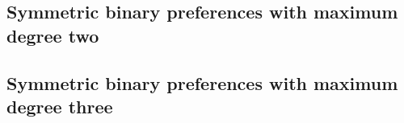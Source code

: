 \subsection{Symmetric binary preferences with maximum degree two}
\label{sec:threed_efr_as_envyfreeness_maxdeg2}



\subsection{Symmetric binary preferences with maximum degree three}
\label{sec:threed_efr_as_envyfreeness_maxdeg3}

